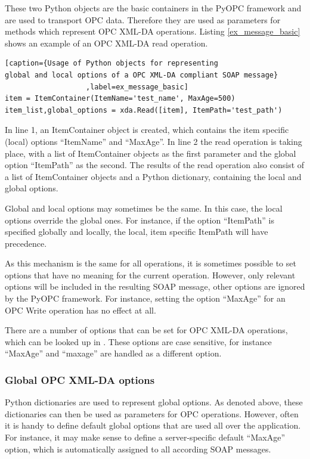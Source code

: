 These two Python objects are the basic containers in the PyOPC
framework and are used to transport OPC data. Therefore they are used
as parameters for methods which represent OPC XML-DA operations.
Listing \ref{ex_message_basic} shows an example of an OPC XML-DA read
operation.

\lstset{language=C}
\begin{lstlisting}[caption={Usage of Python objects for representing
global and local options of a OPC XML-DA compliant SOAP message}
                   ,label=ex_message_basic] 
item = ItemContainer(ItemName='test_name', MaxAge=500)
item_list,global_options = xda.Read([item], ItemPath='test_path')
\end{lstlisting}

In line 1, an ItemContainer object is created, which contains the item
specific (local) options ``ItemName'' and ``MaxAge''. In line 2 the
read operation is taking place, with a list of ItemContainer objects
as the first parameter and the global option ``ItemPath'' as the
second.  The results of the read operation also consist of a list of
ItemContainer objects and a Python dictionary, containing the local
and global options.

Global and local options may sometimes be the same. In this case, the
local options override the global ones. For instance, if the option
``ItemPath'' is specified globally and locally, the local, item
specific ItemPath will have precedence.

As this mechanism is the same for all operations, it is sometimes
possible to set options that have no meaning for the current
operation. However, only relevant options will be included in the
resulting SOAP message, other options are ignored by the PyOPC
framework.  For instance, setting the option ``MaxAge'' for an OPC
Write operation has no effect at all.

There are a number of options that can be set for OPC XML-DA
operations, which can be looked up in \cite{OPCXMLDA}. These options
are case sensitive, for instance ``MaxAge'' and ``maxage'' are handled
as a different option.


\subsubsection*{Global OPC XML-DA options}

Python dictionaries are used to represent global options. As denoted
above, these dictionaries can then be used as parameters for OPC
operations.  However, often it is handy to define default global
options that are used all over the application. For instance, it may
make sense to define a server-specific default ``MaxAge'' option,
which is automatically assigned to all according SOAP messages.

